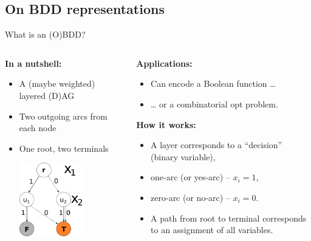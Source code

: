 \documentclass[10pt, xcolor=svgnames]{beamer}
\begin{document}
\subsection{On BDD representations}
\label{sec:org2db8d43}
\begin{frame}[label={sec:org6053e5a}]{What is an (O)BDD?}
\begin{columns}
\begin{column}[t]{0.40\columnwidth}
\textbf{In a nutshell:}
\begin{itemize}
\item A (maybe weighted) layered (D)AG
\item Two outgoing arcs from each node
\item One root, two terminals\vspace{2ex}

\includegraphics[width=0.6\textwidth]{./img/simple-BDD.png}
\end{itemize}
\end{column}
\begin{column}[t]{0.5\columnwidth}
\textbf{Applications:}
\begin{itemize}
\item Can encode a Boolean function \ldots{}
\item \ldots{} or a combinatorial opt problem.
\end{itemize}

\textbf{How it works:}
\begin{itemize}
\item A layer corresponds to a ``decision'' (binary variable),
\item \alert{one-arc} (or yes-arc) -- \(x_i=1\),
\item \alert{zero-arc} (or no-arc) -- \(x_i=0\).
\item A \alert{path} from root to terminal corresponds to an assignment of all
variables.
\end{itemize}
\end{column}
\end{columns}
\end{frame}
\end{document}
